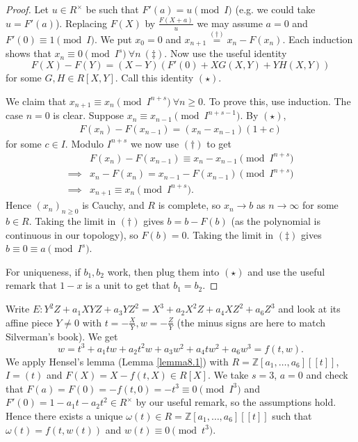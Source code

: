 \documentclass{article}
\theoremstyle{definition}
\begin{document}
\begin{proof}
    Let $u \in R^\times$ be such that $F'(a) = u \pmod{I}$ (e.g. we could take $u = F'(a)$). Replacing $F(X)$ by $\frac{F(X+a)}{u}$ we may assume $a = 0$ and ${F'(0) \equiv 1 \pmod{I}}$. We put $x_0 = 0$ and $x_{n+1} \stackrel{(\dagger)}{=}  x_n - F(x_n)$. Each induction shows that $x_n \equiv 0 \pmod{I^s} ~\forall n ~ (\ddagger)$. Now use the useful identity $$F(X)-F(Y)=(X-Y)(F'(0) + XG(X,Y) + YH(X,Y))$$
    for some $G,H \in R[X,Y]$. Call this identity $(\star)$.
    \vspace{1mm}
     
    We claim that $x_{n+1} \equiv x_n \pmod{I^{n+s}} ~\forall n\ge 0$. To prove this, use induction. The case $n=0$ is clear. Suppose $x_n \equiv x_{n-1} \pmod{I^{n+s-1}}$. By $(\star)$, 
    \begin{align*}
        F(x_n) - F(x_{n-1}) = (x_n-x_{n-1})(1+c)
    \end{align*}
    for some $c \in I$. Modulo $I^{n+s}$ we now use $(\dagger)$ to get
    \begin{align*}
        &F(x_n) - F(x_{n-1}) \equiv x_n-x_{n-1} \pmod{I^{n+s}} \\
        \implies & x_n - F(x_n) = x_{n-1} - F(x_{n-1}) \pmod{I^{n+s}}\\
        \implies & x_{n+1} \equiv x_n \pmod{I^{n+s}}.
    \end{align*}
    Hence $(x_n)_{n\ge 0}$ is Cauchy, and $R$ is complete, so $x_n \to b$ as $n \to \infty$ for some $b \in R$. Taking the limit in $(\dagger)$ gives $b = b - F(b)$ (as the polynomial is continuous in our topology), so $F(b) = 0$. Taking the limit in $(\ddagger)$ gives $b \equiv 0 \equiv a\pmod{I^s}$.

    \vspace{1mm}
     
    For uniqueness, if $b_1,b_2$ work, then plug them into $(\star)$ and use the useful remark that $1-x$ is a unit to get that $b_1=b_2$. 
\end{proof}
Write $E: Y^2Z + a_1 XYZ + a_3 YZ^2 = X^3 + a_2 X^2Z + a_4 XZ^2 + a_6 Z^3$ and look at its affine piece $Y \neq 0$ with $t = -\frac{X}{Y}, w = -\frac{Z}{Y}$ (the minus signs are here to match Silverman's book). We get $$w = t^3 + a_1 tw + a_2 t^2w + a_3w^2 + a_4 tw^2+ a_6w^3 = f(t,w).$$
We apply Hensel's lemma (Lemma \ref{lemma8.1}) with $R = \mathbb{Z}[a_1,\ldots,a_6][[t]]$, $I = (t)$ and $F(X) = X - f(t,X) \in R[X]$. We take $s=3$, $a=0$ and check that $F(a) = F(0) = -f(t,0) = -t^3 \equiv 0 \pmod{I^3}$ and $F'(0) = 1 - a_1t - a_2t^2 \in R^\times$ by our useful remark, so the assumptions hold. Hence there exists a unique $\omega(t) \in R = \mathbb{Z}[a_1,\ldots,a_6][[t]]$ such that $\omega(t) = f(t,w(t))$ and $w(t) \equiv 0 \pmod{t^3}$.
\end{document}
